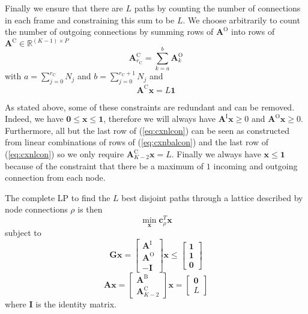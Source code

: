 \documentclass{article}
\newcommand{\cLP}{\boldsymbol{c}_{\rho}}
\newcommand{\BS}[1]{\boldsymbol{#1}}
\begin{document}
\begin{sloppy}
Finally we ensure that there are $L$ paths by counting the number of connections
in each frame and constraining this sum to be $L$. We choose arbitrarily to
count the number of outgoing connections by summing rows of $\BS{A}^{\text{O}}$
into rows of $\BS{A}^{\text{C}} \in \mathbb{R}^{(K-1) \times P}$
\begin{equation}
    \BS{A}^{\text{C}}_{r_{\text{C}}} = \sum_{k=a}^{b} \BS{A}^{\text{O}}_{k}
\end{equation}
with $a = \sum_{j=0}^{r_{\text{C}}} N_{j}$ and $b = \sum_{j=0}^{r_{\text{C}}+1}
N_{j}$ and
\begin{equation}
    \label{eq:cxnlcon}
    \BS{A}^{\text{C}}\BS{x} = L\BS{1}
\end{equation}

As stated above, some of these constraints are redundant and can be removed.
Indeed, we have $\BS{0} \leq \BS{x} \leq \BS{1}$, therefore we will always have
$\BS{A}^{\text{I}}\BS{x} \geq 0$ and $\BS{A}^{\text{O}}\BS{x} \geq 0$.
Furthermore, all but the last row of (\ref{eq:cxnlcon}) can be seen as
constructed from linear combinations of rows of (\ref{eq:cxnbalcon}) and the last
row of (\ref{eq:cxnlcon}) so we only require $\BS{A}^{\text{C}}_{K-2}\BS{x} = L$.
Finally we always have $\BS{x} \leq \BS{1}$ because of the constraint that there
be a maximum of $1$ incoming and outgoing connection from each node.

The complete LP to find the $L$ best disjoint paths through a lattice described
by node connections $\rho$ is then
\[
    \min_{\BS{x}} \cLP^{T} \BS{x} 
\]
subject to
\[
    \BS{G}\BS{x} =
    \begin{bmatrix}
        \BS{A}^{\text{I}} \\
        \BS{A}^{\text{O}} \\
        -\BS{I}
    \end{bmatrix} \BS{x} \leq
    \begin{bmatrix}
        \BS{1} \\
        \BS{1} \\
        \BS{0}
    \end{bmatrix}
\]
\begin{equation}
    \label{eq:lpprogfull}
    \BS{A}\BS{x} =
    \begin{bmatrix}
        \BS{A}^{\text{B}} \\
        \BS{A}^{\text{C}}_{K-2}
    \end{bmatrix} \BS{x} = 
    \begin{bmatrix}
        \BS{0} \\
        L
    \end{bmatrix}
\end{equation}
where $\BS{I}$ is the identity matrix.


\end{sloppy}
\end{document}
